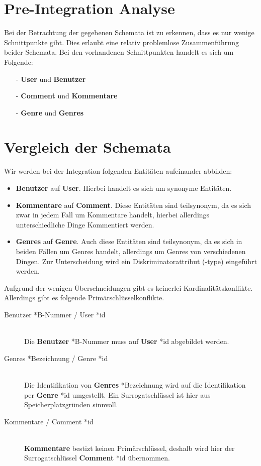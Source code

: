 \documentclass[11pt,a4paper,DIV=9]{scrartcl}
\begin{document}
\section{Pre-Integration Analyse}
  Bei der Betrachtung der gegebenen Schemata ist zu erkennen, dass es nur wenige Schnittpunkte gibt. Dies erlaubt eine relativ problemlose Zusammenführung beider Schemata.
  Bei den vorhandenen Schnittpunkten handelt es sich um Folgende:
  \begin{itemize}
    \item[-] \textbf{User} und \textbf{Benutzer}
    \item[-] \textbf{Comment} und \textbf{Kommentare}
    \item[-] \textbf{Genre} und \textbf{Genres}
  \end{itemize}

\section{Vergleich der Schemata}
  Wir werden bei der Integration folgenden Entitäten aufeinander abbilden:
  \begin{itemize}
    \item \textbf{Benutzer} auf \textbf{User}. Hierbei handelt es sich um synonyme Entitäten.
    \item \textbf{Kommentare} auf \textbf{Comment}. Diese Entitäten sind teilsynonym, da es sich zwar in jedem Fall um Kommentare handelt, hierbei allerdings unterschiedliche Dinge Kommentiert werden.
    \item \textbf{Genres} auf \textbf{Genre}. Auch diese Entitäten sind teilsynonym, da es sich in beiden Fällen um Genres handelt, allerdings um Genres von verschiedenen Dingen. Zur Unterscheidung wird ein Diskriminatorattribut (-type) eingeführt werden. 
  \end{itemize}

  Aufgrund der wenigen Überschneidungen gibt es keinerlei Kardinalitätskonflikte. Allerdings gibt es folgende Primärschlüsselkonflikte.
  \begin{description}
    \item[Benutzer *B-Nummer / User *id] \hfill \\
      Die \textbf{Benutzer} *B-Nummer muss auf \textbf{User} *id abgebildet werden.
    \item[Genres *Bezeichnung / Genre *id] \hfill \\
      Die Identifikation von \textbf{Genres} *Bezeichnung wird auf die Identifikation per \textbf{Genre} *id umgestellt. Ein Surrogatschlüssel ist hier aus Speicherplatzgründen sinnvoll.
    \item[Kommentare / Comment *id] \hfill \\
      \textbf{Kommentare} bestizt keinen Primärschlüssel, deshalb wird hier der Surrogatschlüssel \textbf{Comment} *id übernommen.
  \end{description}
  
\end{document}
